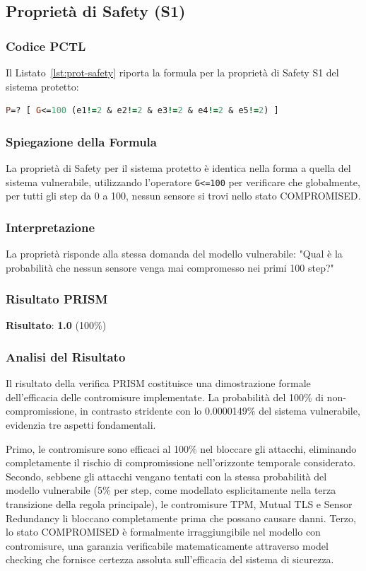 \subsection{Proprietà di Safety (S1)}

\subsubsection{Codice PCTL}
Il Listato~\ref{lst:prot-safety} riporta la formula per la proprietà di Safety S1 del sistema protetto:
\begin{lstlisting}[style=mystyle, language=Prolog, caption={Proprietà Safety S1 (protetto)}, label=lst:prot-safety]
P=? [ G<=100 (e1!=2 & e2!=2 & e3!=2 & e4!=2 & e5!=2) ]
\end{lstlisting}

\subsubsection{Spiegazione della Formula}
La proprietà di Safety per il sistema protetto è identica nella forma a quella del sistema vulnerabile, utilizzando l'operatore \texttt{G<=100} per verificare che globalmente, per tutti gli step da 0 a 100, nessun sensore si trovi nello stato COMPROMISED.

\subsubsection{Interpretazione}
La proprietà risponde alla stessa domanda del modello vulnerabile: "Qual è la probabilità che nessun sensore venga mai compromesso nei primi 100 step?"

\subsubsection{Risultato PRISM}
\textbf{Risultato}: \textbf{1.0} (100\%)

\subsubsection{Analisi del Risultato}
Il risultato della verifica PRISM costituisce una dimostrazione formale dell'efficacia delle contromisure implementate. La probabilità del 100\% di non-compromissione, in contrasto stridente con lo 0.0000149\% del sistema vulnerabile, evidenzia tre aspetti fondamentali.

Primo, le contromisure sono efficaci al 100\% nel bloccare gli attacchi, eliminando completamente il rischio di compromissione nell'orizzonte temporale considerato. Secondo, sebbene gli attacchi vengano tentati con la stessa probabilità del modello vulnerabile (5\% per step, come modellato esplicitamente nella terza transizione della regola principale), le contromisure TPM, Mutual TLS e Sensor Redundancy li bloccano completamente prima che possano causare danni. Terzo, lo stato COMPROMISED è formalmente irraggiungibile nel modello con contromisure, una garanzia verificabile matematicamente attraverso model checking che fornisce certezza assoluta sull'efficacia del sistema di sicurezza.

